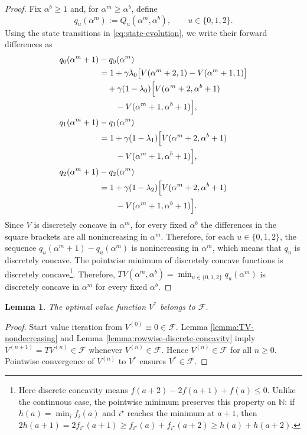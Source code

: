 \documentclass[letterpaper,journal]{IEEEtran}
\newtheorem{lemma}{Lemma}
\begin{document}
\begin{proof}
Fix $\alpha^b \ge 1$ and, for $\alpha^m \ge \alpha^b$, define
\[
q_u(\alpha^m) := Q_u(\alpha^m,\alpha^b), \qquad u \in \{0,1,2\}.
\]
Using the state transitions in \eqref{eq:state-evolution}, we write their forward differences as
\begin{align*}
q_0(\alpha^m+1)&-q_0(\alpha^m)\\
&=1+\gamma\lambda_0\bigl[V(\alpha^m+2,1)-V(\alpha^m+1,1)\bigr]\\
&\quad+\gamma(1-\lambda_0)\Bigl[V(\alpha^m+2,\alpha^b+1)\\
&\qquad -V(\alpha^m+1,\alpha^b+1)\Bigr],\\
q_1(\alpha^m+1)&-q_1(\alpha^m)\\
&=1+\gamma(1-\lambda_1)\Bigl[V(\alpha^m+2,\alpha^b+1)\\
&\qquad -V(\alpha^m+1,\alpha^b+1)\Bigr],\\
q_2(\alpha^m+1)&-q_2(\alpha^m)\\
&=1+\gamma(1-\lambda_2)\Bigl[V(\alpha^m+2,\alpha^b+1)\\
&\qquad -V(\alpha^m+1,\alpha^b+1)\Bigr].
\end{align*}
Since $V$ is discretely concave in $\alpha^m$, for every fixed $\alpha^b$ the differences in the square brackets are all nonincreasing in $\alpha^m$. Therefore, for each $u \in \{0,1,2\}$, the sequence $q_u(\alpha^m+1)-q_u(\alpha^m)$ is nonincreasing in $\alpha^m$, which means that $q_u$ is discretely concave. The pointwise minimum of discretely concave functions is discretely concave\footnote{Here discrete concavity means $f(a+2)-2f(a+1)+f(a)\le 0$. Unlike the continuous case, the pointwise minimum preserves this property on $\mathbb N$: if $h(a)=\min_i f_i(a)$ and $i^\star$ reaches the minimum at $a+1$, then $2h(a+1)=2f_{i^\star}(a+1)\ge f_{i^\star}(a)+f_{i^\star}(a+2)\ge h(a)+h(a+2)$.}. Therefore, $TV(\alpha^m,\alpha^b) = \min_{u\in\{0,1,2\}} q_u(\alpha^m)$ is discretely concave in $\alpha^m$ for every fixed $\alpha^b$.
\end{proof}

\begin{lemma}\label{lemma:Vstar-in-F}
The optimal value function $V^*$ belongs to $\mathcal F$.
\end{lemma}

\begin{proof}
Start value iteration from $V^{(0)}\equiv 0\in\mathcal F$. Lemma \ref{lemma:TV-nondecreasing} and Lemma \ref{lemma:rowwise-discrete-concavity} imply $V^{(n+1)}=TV^{(n)}\in\mathcal F$ whenever $V^{(n)}\in\mathcal F$. Hence $V^{(n)}\in\mathcal F$ for all $n\ge 0$. Pointwise convergence of $V^{(n)}$ to $V^*$ ensures $V^*\in\mathcal F$.
\end{proof}
\end{document}
